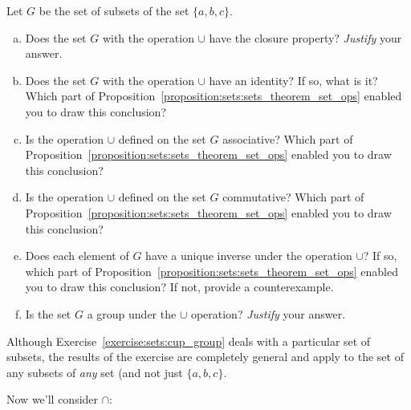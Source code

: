 \begin{exercise}\label{exercise:sets:cup_group}
Let $G$ be the set of subsets of the set $\{a,b,c\}$.
\begin{enumerate}[(a)]
\item
Does the set $G$  with the operation $\cup$ have the closure property? \emph{Justify} your answer.
\item
Does the set $G$  with the operation $\cup$ have an identity? If so, what is it? Which part of  Proposition~\ref{proposition:sets:sets_theorem_set_ops} enabled you to draw this conclusion?
\item
Is the operation $\cup$ defined on the set $G$ associative? Which part of  Proposition~\ref{proposition:sets:sets_theorem_set_ops} enabled you to draw this conclusion?
\item
Is the operation $\cup$ defined on the set $G$ commutative? Which part of  Proposition~\ref{proposition:sets:sets_theorem_set_ops} enabled you to draw this conclusion?
\item
Does each element of $G$ have a unique inverse under the operation $\cup$? If so, which part of  Proposition~\ref{proposition:sets:sets_theorem_set_ops} enabled you to draw this conclusion? If not, provide a counterexample.
\item
Is the set $G$ a group under the $\cup$ operation?  \emph{Justify} your answer.
\end{enumerate}
\end{exercise} 

Although Exercise~\ref{exercise:sets:cup_group} deals with a particular set of subsets,  the results of the  exercise are completely general and apply to the set of any subsets of \emph{any} set (and not just $\{a,b,c\}$.  
 
Now we'll consider $\cap$:


